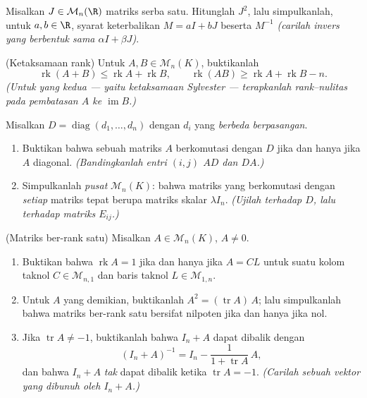 \begin{exercise}[$\star\star\star$]\label{exo:b1:matrices:9}
Misalkan $J \in \mathcal{M}_n(\R)$ matriks serba satu. Hitunglah $J^2$,
lalu simpulkanlah, untuk $a, b \in \R$, syarat keterbalikan $M
= aI + bJ$ beserta $M^{-1}$ \emph{(carilah invers yang
berbentuk sama $\alpha I + \beta J$)}.
\end{exercise}

\begin{exercise}[$\star\star\star$]\label{exo:b1:matrices:10}
(Ketaksamaan rank) Untuk $A, B \in \mathcal{M}_n(K)$, buktikanlah
\[
\operatorname{rk}(A + B) \leq \operatorname{rk} A +
\operatorname{rk} B,
\qquad
\operatorname{rk}(AB) \geq \operatorname{rk} A + \operatorname{rk}
B - n .
\]
\emph{(Untuk yang kedua --- yaitu ketaksamaan Sylvester --- terapkanlah
rank--nulitas pada pembatasan  $A$ ke
$\operatorname{im} B$.)}
\end{exercise}

\begin{exercise}[$\star\star$]\label{exo:b1:matrices:11}
Misalkan $D = \operatorname{diag}(d_1, \dots, d_n)$ dengan $d_i$ yang
\emph{berbeda berpasangan}.
\begin{enumerate}
  \item Buktikan bahwa sebuah matriks $A$ berkomutasi dengan $D$ jika dan hanya jika
        $A$ diagonal. \emph{(Bandingkanlah entri $(i,j)$
        $AD$ dan $DA$.)}
  \item Simpulkanlah \emph{pusat} $\mathcal{M}_n(K)$: bahwa
        matriks yang berkomutasi dengan \emph{setiap} matriks tepat berupa
        matriks skalar $\lambda I_n$. \emph{(Ujilah terhadap
        $D$, lalu terhadap matriks $E_{ij}$.)}
\end{enumerate}
\end{exercise}

\begin{exercise}[$\star\star\star$]\label{exo:b1:matrices:12}
(Matriks ber-rank satu) Misalkan $A \in \mathcal{M}_n(K)$, $A \neq 0$.
\begin{enumerate}
  \item Buktikan bahwa $\operatorname{rk} A = 1$ jika dan hanya jika $A =
        CL$ untuk suatu kolom taknol $C \in \mathcal{M}_{n,1}$ dan
        baris taknol $L \in \mathcal{M}_{1,n}$.
  \item Untuk $A$ yang demikian, buktikanlah $A^2 = (\operatorname{tr} A)\,A$;
        lalu simpulkanlah bahwa matriks ber-rank satu bersifat nilpoten jika dan hanya jika
         nol.
  \item Jika $\operatorname{tr} A \neq -1$, buktikanlah bahwa $I_n + A$
        dapat dibalik dengan
        \[
        (I_n + A)^{-1} = I_n - \frac{1}{1 + \operatorname{tr}
        A}\,A ,
        \]
        dan bahwa $I_n + A$ \emph{tak} dapat dibalik ketika
        $\operatorname{tr} A = -1$. \emph{(Carilah sebuah vektor yang dibunuh
        oleh $I_n + A$.)}
\end{enumerate}
\end{exercise}

